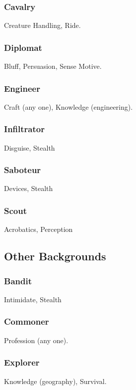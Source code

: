 \subsubsection{Cavalry}
 Creature Handling, Ride.

\subsubsection{Diplomat}
 Bluff, Persuasion, Sense Motive.

\subsubsection{Engineer}
 Craft (any one), Knowledge (engineering).

\subsubsection{Infiltrator}
 Disguise, Stealth

\subsubsection{Saboteur}
 Devices, Stealth

\subsubsection{Scout}
 Acrobatics, Perception

\subsection{Other Backgrounds}

\subsubsection{Bandit}
 Intimidate, Stealth

\subsubsection{Commoner}
 Profession (any one).

\subsubsection{Explorer}
 Knowledge (geography), Survival.

